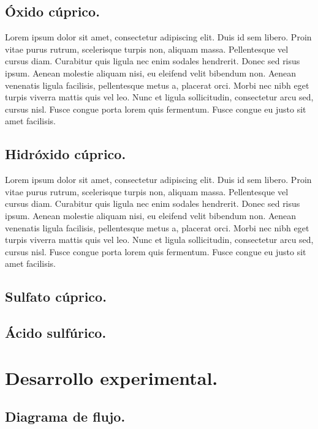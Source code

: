 \documentclass[letter]{article}
\begin{document}
    \subsection{Óxido cúprico.}
        Lorem ipsum dolor sit amet, consectetur adipiscing elit. Duis id sem libero. Proin vitae purus rutrum, scelerisque turpis non, aliquam massa. Pellentesque vel cursus diam. Curabitur quis ligula nec enim sodales hendrerit. Donec sed risus ipsum. Aenean molestie aliquam nisi, eu eleifend velit bibendum non. Aenean venenatis ligula facilisis, pellentesque metus a, placerat orci. Morbi nec nibh eget turpis viverra mattis quis vel leo. Nunc et ligula sollicitudin, consectetur arcu sed, cursus nisl. Fusce congue porta lorem quis fermentum. Fusce congue eu justo sit amet facilisis.\par
    \subsection{Hidróxido cúprico.}
        Lorem ipsum dolor sit amet, consectetur adipiscing elit. Duis id sem libero. Proin vitae purus rutrum, scelerisque turpis non, aliquam massa. Pellentesque vel cursus diam. Curabitur quis ligula nec enim sodales hendrerit. Donec sed risus ipsum. Aenean molestie aliquam nisi, eu eleifend velit bibendum non. Aenean venenatis ligula facilisis, pellentesque metus a, placerat orci. Morbi nec nibh eget turpis viverra mattis quis vel leo. Nunc et ligula sollicitudin, consectetur arcu sed, cursus nisl. Fusce congue porta lorem quis fermentum. Fusce congue eu justo sit amet facilisis.\par
    \subsection*{Sulfato cúprico.}
    
    \subsection*{Ácido sulfúrico.}


\section{Desarrollo experimental.}
\subsection{Diagrama de flujo.}\par
 \begin{center}
\end{center}
\end{document}

